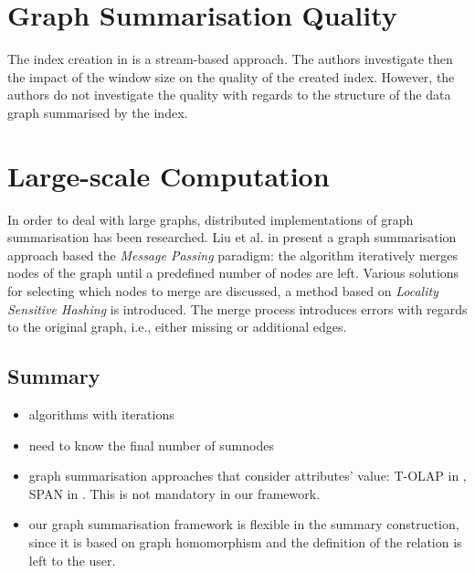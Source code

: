 \section{Graph Summarisation Quality}

The index creation in \cite{konrath:jws:2012} is a stream-based approach. The authors investigate then the impact of the window size on the quality of the created index. However, the authors do not investigate the quality with regards to the structure of the data graph summarised by the index.

\section{Large-scale Computation}
\label{chap03:review:large-scale-comp}

In order to deal with large graphs, distributed implementations of graph summarisation has been researched.
Liu et al. in \cite{liu:cikm:2014} present a graph summarisation approach based the \emph{Message Passing} paradigm: the algorithm iteratively merges nodes of the graph until a predefined number of nodes are left. Various solutions for selecting which nodes to merge are discussed, a method based on \emph{Locality Sensitive Hashing} is introduced. The merge process introduces errors with regards to the original graph, i.e., either missing or additional edges.

\subsection{Summary}

\begin{itemize}
\item algorithms with iterations
\item need to know the final number of sumnodes
\item graph summarisation approaches that consider attributes' value: T-OLAP in \cite{chen:icdm:2008}, SPAN in \cite{tian:sigmod:2008}. This is not mandatory in our framework.
\item our graph summarisation framework is flexible in the summary construction, since it is based on graph homomorphism and the definition of the relation is left to the user.
\end{itemize}
